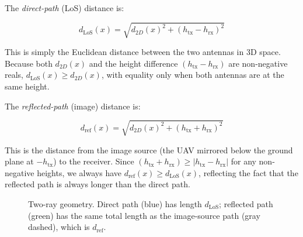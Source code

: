 \documentclass[11pt,a4paper]{article}
\begin{document}
The \emph{direct-path} (LoS) distance is:

\begin{equation}
d_{\mathrm{LoS}}(x)
=
\sqrt{d_{2D}(x)^2 + (h_{\mathrm{tx}} - h_{\mathrm{rx}})^2}
\label{eq:d_los}
\end{equation}

This is simply the Euclidean distance between the two antennas in 3D space.
Because both $d_{2D}(x)$ and the height difference $(h_{\mathrm{tx}} -
h_{\mathrm{rx}})$ are non-negative reals, $d_{\mathrm{LoS}}(x) \ge
d_{2D}(x)$, with equality only when both antennas are at the same height.

The \emph{reflected-path} (image) distance is:

\begin{equation}
d_{\mathrm{ref}}(x)
=
\sqrt{d_{2D}(x)^2 + (h_{\mathrm{tx}} + h_{\mathrm{rx}})^2}
\label{eq:d_ref}
\end{equation}

This is the distance from the image source (the UAV mirrored below the
ground plane at $-h_{\mathrm{tx}}$) to the receiver. Since $(h_{\mathrm{tx}}
+ h_{\mathrm{rx}}) \ge |h_{\mathrm{tx}} - h_{\mathrm{rx}}|$ for any
non-negative heights, we always have $d_{\mathrm{ref}}(x) \ge
d_{\mathrm{LoS}}(x)$, reflecting the fact that the reflected path is always
longer than the direct path.

\begin{figure}[H]
\centering
{}
\caption{Two-ray geometry. Direct path (blue) has length $d_{\mathrm{LoS}}$;
reflected path (green) has the same total length as the image-source path
(gray dashed), which is $d_{\mathrm{ref}}$.}
\label{fig:tworay}
\end{figure}
\end{document}
